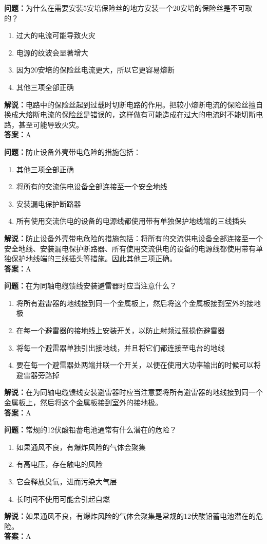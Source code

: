 \documentclass[UTF8]{ctexbook}
\begin{document}
\textbf{问题：}为什么在需要安装5安培保险丝的地方安装一个20安培的保险丝是不可取的？
\begin{enumerate}[label=\Alph*), leftmargin=3em]
  \item 过大的电流可能导致火灾
  \item 电源的纹波会显著增大
  \item 因为20安培的保险丝电流更大，所以它更容易熔断
  \item 其他三项全部正确
\end{enumerate}
\textbf{解说：}电路中的保险丝起到过载时切断电路的作用。把较小熔断电流的保险丝擅自换成大熔断电流的保险丝是错误的，这样做有可能造成在过大的电流时不能切断电路，甚至可能导致火灾。\\
\textbf{答案：}A

\textbf{问题：}防止设备外壳带电危险的措施包括：
\begin{enumerate}[label=\Alph*), leftmargin=3em]
  \item 其他三项全部正确
  \item 将所有的交流供电设备全部连接至一个安全地线
  \item 安装漏电保护断路器
  \item 所有使用交流供电的设备的电源线都使用带有单独保护地线端的三线插头
\end{enumerate}
\textbf{解说：}防止设备外壳带电危险的措施包括：将所有的交流供电设备全部连接至一个安全地线、安装漏电保护断路器、所有使用交流供电的设备的电源线都使用带有单独保护地线端的三线插头等措施。因此其他三项正确。\\
\textbf{答案：}A

\textbf{问题：}在为同轴电缆馈线安装避雷器时应当注意什么？
\begin{enumerate}[label=\Alph*), leftmargin=3em]
  \item 将所有避雷器的地线接到同一个金属板上，然后将这个金属板接到室外的接地极
  \item 在每一个避雷器的接地线上安装开关，以防止射频过载损伤避雷器
  \item 将每一个避雷器单独引出接地线，并且将它们都连接至电台的地线
  \item 要在每一个避雷器处两端并联一个开关，以便在使用大功率输出的时候可以将避雷器旁路掉
\end{enumerate}
\textbf{解说：}在为同轴电缆馈线安装避雷器时应当注意要将所有避雷器的地线接到同一个金属板上，然后将这个金属板接到室外的接地极。\\
\textbf{答案：}A

\textbf{问题：}常规的12伏酸铅蓄电池通常有什么潜在的危险？
\begin{enumerate}[label=\Alph*), leftmargin=3em]
  \item 如果通风不良，有爆炸风险的气体会聚集
  \item 有高电压，存在触电的风险
  \item 它会释放臭氧，进而污染大气层
  \item 长时间不使用可能会引起自燃
\end{enumerate}
\textbf{解说：}如果通风不良，有爆炸风险的气体会聚集是常规的12伏酸铅蓄电池潜在的危险。\\
\textbf{答案：}A
\end{document}

